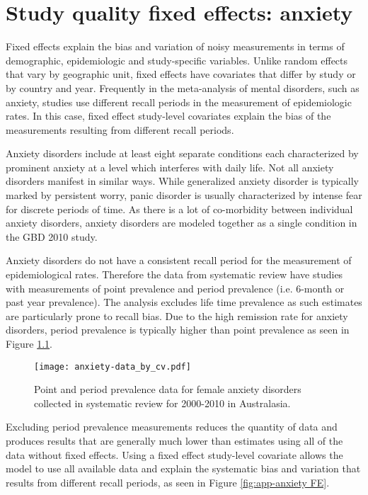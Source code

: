 \chapter{Study quality fixed effects: anxiety}
\label{applications-efx_study_level}

Fixed effects explain the bias and variation of noisy measurements in terms of demographic, epidemiologic and study-specific variables.  Unlike random effects that vary by geographic unit, fixed effects have covariates that differ by study or by country and year.  Frequently in the meta-analysis of mental disorders, such as anxiety, studies use different recall periods in the measurement of epidemiologic rates.  In this case, fixed effect study-level covariates explain the bias of the measurements resulting from different recall periods.

Anxiety disorders include at least eight separate conditions each characterized by prominent anxiety at a level which interferes with daily life.  Not all anxiety disorders manifest in similar ways.  While generalized anxiety disorder is typically marked by persistent worry, panic disorder is usually characterized by intense fear for discrete periods of time. \cite{american_diagnostic_2000}  As there is a lot of co-morbidity between individual anxiety disorders, anxiety disorders are modeled together as a single condition in the GBD 2010 study.

Anxiety disorders do not have a consistent recall period for the measurement of epidemiological rates.  Therefore the data from systematic review have studies with measurements of point prevalence and period prevalence (i.e. 6-month or past year prevalence).  The analysis excludes life time prevalence as such estimates are particularly prone to recall bias.  Due to the high remission rate for anxiety disorders, period prevalence is typically higher than point prevalence as seen in Figure \ref{fig:app-anxiety data}.

    \begin{figure}[h]
        \begin{center}
            \texttt{[image: anxiety-data\_by\_cv.pdf]}
            \caption{Point and period prevalence data for female anxiety disorders collected in systematic review for 2000-2010 in Australasia.}
            \label{fig:app-anxiety data}
        \end{center}
    \end{figure}

Excluding period prevalence measurements reduces the quantity of data and produces results that are generally much lower than estimates using all of the data without fixed effects.  Using a fixed effect study-level covariate allows the model to use all available data and explain the systematic bias and variation that results from different recall periods, as seen in Figure \ref{fig:app-anxiety FE}.

